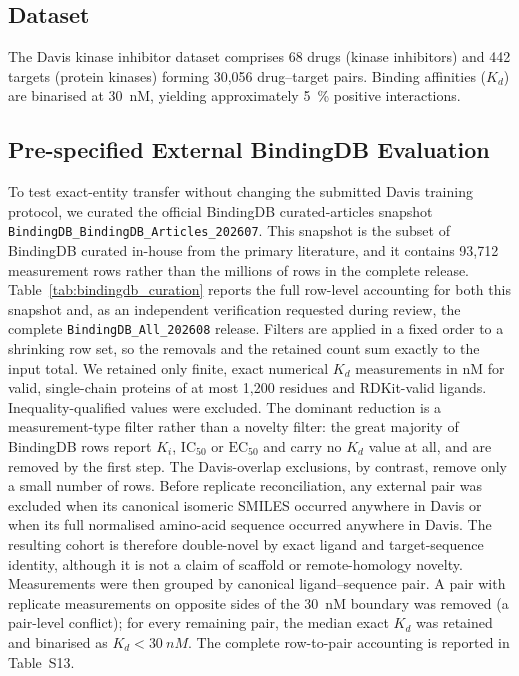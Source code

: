 \documentclass[fleqn,10pt]{wlscirep}
\begin{document}
\subsection{Dataset}

The Davis kinase inhibitor
dataset\cite{davis2011comprehensive} comprises 68 drugs (kinase inhibitors)
and 442 targets (protein kinases) forming 30{,}056 drug--target pairs.  Binding
affinities ($K_d$) are binarised at \SI{30}{nM}, yielding approximately
\SI{5}{\percent} positive interactions.

\subsection{Pre-specified External BindingDB Evaluation}
\label{sec:bindingdb_methods}

To test exact-entity transfer without changing the submitted Davis training
protocol, we curated the official BindingDB curated-articles snapshot
\texttt{BindingDB\_BindingDB\_Articles\_202607}.\cite{gilson2016bindingdb}
This snapshot is the subset of BindingDB curated in-house from the primary
literature, and it contains 93{,}712 measurement rows rather than the millions
of rows in the complete release.  Table~\ref{tab:bindingdb_curation} reports the
full row-level accounting for both this snapshot and, as an independent
verification requested during review, the complete
\texttt{BindingDB\_All\_202608} release.  Filters are applied in a fixed order
to a shrinking row set, so the removals and the retained count sum exactly to
the input total.
We retained only finite, exact numerical $K_d$ measurements in nM for valid,
single-chain proteins of at most 1{,}200 residues and RDKit-valid ligands.
Inequality-qualified values were excluded.
The dominant reduction is a measurement-type filter rather than a novelty
filter: the great majority of BindingDB rows report $K_i$, $\mathrm{IC}_{50}$ or
$\mathrm{EC}_{50}$ and carry no $K_d$ value at all, and are removed by the first
step.  The Davis-overlap exclusions, by contrast, remove only a small number of
rows.
Before replicate reconciliation, any
external pair was excluded when its canonical isomeric
SMILES occurred anywhere in Davis or when its full normalised amino-acid
sequence occurred anywhere in Davis.  The resulting cohort is therefore
double-novel by exact ligand and target-sequence identity, although it is not a
claim of scaffold or remote-homology novelty. Measurements were then grouped by
canonical ligand--sequence pair. A pair with replicate measurements on opposite
sides of the \SI{30}{nM} boundary was removed (a pair-level conflict); for every
remaining pair, the median exact $K_d$ was retained and binarised as
$K_d<\SI{30}{nM}$. The complete row-to-pair accounting is reported in
Table~S13.
\end{document}
